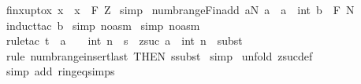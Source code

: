 \begin{isabellebody}
\ fin{\isacharunderscore}x{\isacharunderscore}upto{\isacharunderscore}x{\isacharcolon}\ {\isachardoublequoteopen}{\isacharparenleft}x\ {\isachardot}{\isachardot}\ x{\isacharparenright}\ {\isacharcolon}\ {\isacharpercent}F\ {\isacharpercent}Z{\isachardoublequoteclose}\isanewline
%
\isadelimproof
%
\endisadelimproof
%
\isatagproof
{}\isamarkupfalse%
\ simp\isanewline
{}\isamarkupfalse%
%
\endisatagproof
{\isafoldproof}%
%
\isadelimproof
\isanewline
%
\endisadelimproof
\isanewline
\isanewline
{}\isamarkupfalse%
\ numb{\isacharunderscore}range{\isacharunderscore}Fin{\isacharunderscore}add{\isacharcolon}\ {\isachardoublequoteopen}a{\isacharcolon}{\isacharpercent}N\ {\isasymLongrightarrow}{\isacharparenleft}a\ {\isachardot}{\isachardot}\ {\isacharparenleft}a\ {\isacharplus}\ int\ b{\isacharparenright}{\isacharparenright}\ {\isacharcolon}\ {\isacharpercent}F\ {\isacharpercent}N{\isachardoublequoteclose}\isanewline
%
\isadelimproof
%
\endisadelimproof
%
\isatagproof
{}\isamarkupfalse%
\ {\isacharparenleft}induct{\isacharunderscore}tac\ {\isachardoublequoteopen}b{\isachardoublequoteclose}{\isacharparenright}\isanewline
{}\isamarkupfalse%
\ {\isacharparenleft}simp\ {\isacharparenleft}no{\isacharunderscore}asm{\isacharparenright}{\isacharparenright}\isanewline
{}\isamarkupfalse%
\ {\isacharparenleft}simp\ {\isacharparenleft}no{\isacharunderscore}asm{\isacharparenright}{\isacharparenright}{\isacharplus}\isanewline
{}\isamarkupfalse%
\ {\isacharparenleft}rule{\isacharunderscore}tac\ t\ {\isacharequal}\ {\isachardoublequoteopen}a\ {\isacharplus}\ {\isacharparenleft}{}\ {\isacharplus}\ int\ n{\isacharparenright}{\isachardoublequoteclose}\ \ s\ {\isacharequal}\ {\isachardoublequoteopen}zsuc\ {\isacharparenleft}a\ {\isacharplus}\ int\ n{\isacharparenright}{\isachardoublequoteclose}\ \ subst{\isacharparenright}\isanewline
{}\isamarkupfalse%
\ {}\isanewline
{}\isamarkupfalse%
\ {\isacharparenleft}rule\ numb{\isacharunderscore}range{\isacharunderscore}insert{\isacharunderscore}last\ {\isacharbrackleft}THEN\ ssubst{\isacharbrackright}{\isacharparenright}\isanewline
{}\isamarkupfalse%
\ simp{\isacharplus}\isanewline
{}\isamarkupfalse%
\ {\isacharparenleft}unfold\ zsuc{\isacharunderscore}def{\isacharparenright}\isanewline
{}\isamarkupfalse%
\ {\isacharparenleft}simp\ add{\isacharcolon}\ ring{\isacharunderscore}eq{\isacharunderscore}simps{\isacharparenright}\isanewline

\end{isabellebody}
